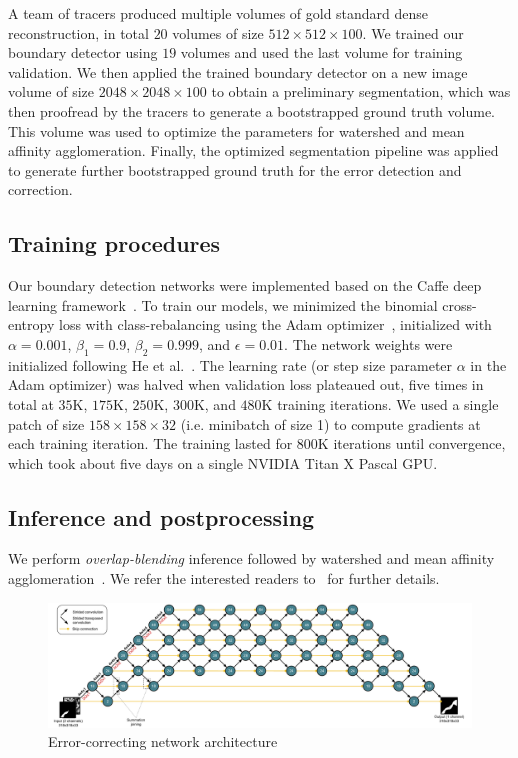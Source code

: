 \documentclass{article}
\begin{document}
A team of tracers produced multiple volumes of gold standard dense reconstruction, in total $20$ volumes of size $512 \times 512 \times 100$. We trained our boundary detector using $19$ volumes and used the last volume for training validation. We then applied the trained boundary detector on a new image volume of size $2048 \times 2048 \times 100$ to obtain a preliminary segmentation, which was then proofread by the tracers to generate a bootstrapped ground truth volume. This volume was used to optimize the parameters for watershed and mean affinity agglomeration. Finally, the optimized segmentation pipeline was applied to generate further bootstrapped ground truth for the error detection and correction.

\subsection{Training procedures}
Our boundary detection networks were implemented based on the Caffe deep
learning framework~\cite{jia2014caffe}. To train our models, we minimized the
binomial cross-entropy loss with class-rebalancing using the Adam
optimizer~\cite{adam}, initialized with $\alpha=0.001$, $\beta_1=0.9$,
$\beta_2=0.999$, and $\epsilon=0.01$. The network weights were initialized
following He et al.~\cite{he2015delving}. The learning rate (or step size
parameter $\alpha$ in the Adam optimizer) was halved when validation loss
plateaued out, five times in total at $35$K, $175$K, $250$K, $300$K, and
$480$K training iterations. We used a single patch of size
$158\times158\times32$ (i.e. minibatch of size 1) to compute gradients at each
training iteration. The training lasted for $800$K iterations until convergence,
which took about five days on a single NVIDIA Titan X Pascal GPU.

\subsection{Inference and postprocessing}
We perform \emph{overlap-blending} inference followed by watershed and mean
affinity agglomeration~\cite{kisuk}. We refer the interested readers
to~\cite{kisuk} for further details.

\label{appendix:architecture}
\begin{figure}
\centering
\includegraphics[width=1.0\linewidth]{corrector.pdf}
\caption{Error-correcting network architecture}
\end{figure}
\end{document}
